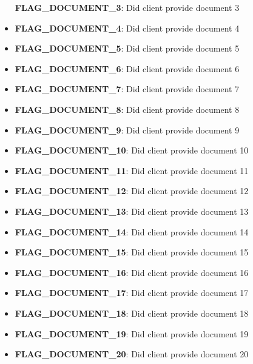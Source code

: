 \documentclass[11pt]{article}
\begin{document}
\begin{itemize}
  \textbf{FLAG\_DOCUMENT\_3}: Did client provide document 3\\
\item
  \textbf{FLAG\_DOCUMENT\_4}: Did client provide document 4\\
\item
  \textbf{FLAG\_DOCUMENT\_5}: Did client provide document 5\\
\item
  \textbf{FLAG\_DOCUMENT\_6}: Did client provide document 6\\
\item
  \textbf{FLAG\_DOCUMENT\_7}: Did client provide document 7\\
\item
  \textbf{FLAG\_DOCUMENT\_8}: Did client provide document 8\\
\item
  \textbf{FLAG\_DOCUMENT\_9}: Did client provide document 9\\
\item
  \textbf{FLAG\_DOCUMENT\_10}: Did client provide document 10\\
\item
  \textbf{FLAG\_DOCUMENT\_11}: Did client provide document 11\\
\item
  \textbf{FLAG\_DOCUMENT\_12}: Did client provide document 12\\
\item
  \textbf{FLAG\_DOCUMENT\_13}: Did client provide document 13\\
\item
  \textbf{FLAG\_DOCUMENT\_14}: Did client provide document 14\\
\item
  \textbf{FLAG\_DOCUMENT\_15}: Did client provide document 15\\
\item
  \textbf{FLAG\_DOCUMENT\_16}: Did client provide document 16\\
\item
  \textbf{FLAG\_DOCUMENT\_17}: Did client provide document 17\\
\item
  \textbf{FLAG\_DOCUMENT\_18}: Did client provide document 18\\
\item
  \textbf{FLAG\_DOCUMENT\_19}: Did client provide document 19\\
\item
  \textbf{FLAG\_DOCUMENT\_20}: Did client provide document 20\\

\end{itemize}
\end{document}
